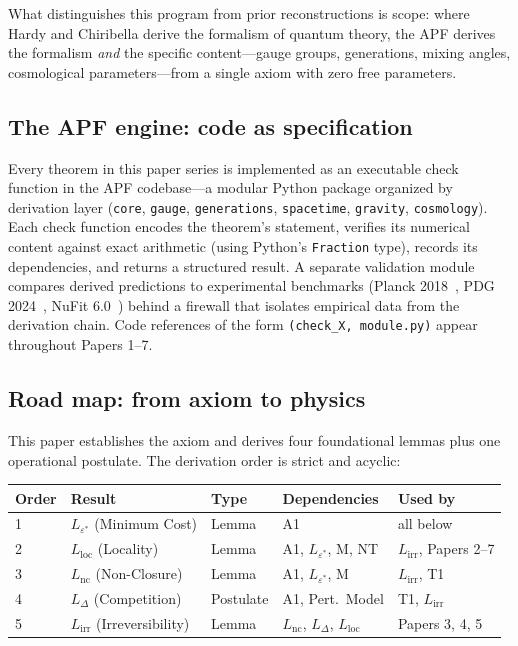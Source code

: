 \documentclass[11pt]{article}
\begin{document}
What distinguishes this program from prior reconstructions is scope: where Hardy and Chiribella derive the formalism of quantum theory, the APF derives the formalism \emph{and} the specific content---gauge groups, generations, mixing angles, cosmological parameters---from a single axiom with zero free parameters.


\subsection{The APF engine: code as specification}

Every theorem in this paper series is implemented as an executable check function in the APF codebase---a modular Python package organized by derivation layer (\texttt{core}, \texttt{gauge}, \texttt{generations}, \texttt{spacetime}, \texttt{gravity}, \texttt{cosmology}).  Each check function encodes the theorem's statement, verifies its numerical content against exact arithmetic (using Python's \texttt{Fraction} type), records its dependencies, and returns a structured result.  A separate validation module compares derived predictions to experimental benchmarks (Planck 2018~\cite{Planck2018}, PDG 2024~\cite{PDG2024}, NuFit 6.0~\cite{NuFit2024}) behind a firewall that isolates empirical data from the derivation chain.  Code references of the form \texttt{(check\_X, module.py)} appear throughout Papers 1--7.


\subsection{Road map: from axiom to physics}

This paper establishes the axiom and derives four foundational lemmas plus one operational postulate.  The derivation order is strict and acyclic:

\begin{center}
\begin{tabular}{lllll}
\toprule
\textbf{Order} & \textbf{Result} & \textbf{Type} & \textbf{Dependencies} & \textbf{Used by} \\
\midrule
1 & $L_{\varepsilon^*}$ (Minimum Cost) & Lemma & A1 & all below \\
2 & $L_{\mathrm{loc}}$ (Locality) & Lemma & A1, $L_{\varepsilon^*}$, M, NT & $L_{\mathrm{irr}}$, Papers 2--7 \\
3 & $L_{\mathrm{nc}}$ (Non-Closure) & Lemma & A1, $L_{\varepsilon^*}$, M & $L_{\mathrm{irr}}$, T1 \\
4 & $L_{\Delta}$ (Competition) & Postulate & A1, Pert.\ Model & T1, $L_{\mathrm{irr}}$ \\
5 & $L_{\mathrm{irr}}$ (Irreversibility) & Lemma & $L_{\mathrm{nc}}$, $L_\Delta$, $L_{\mathrm{loc}}$ & Papers 3, 4, 5 \\
\bottomrule
\end{tabular}
\end{center}
\end{document}

